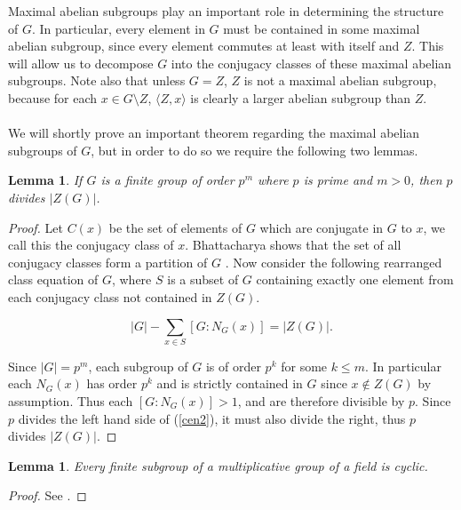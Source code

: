 \documentclass[a4paper , 11pt]{book}
\newtheorem{lemma}[theorem]{Lemma}
\theoremstyle{definition}
\theoremstyle{remark}
\begin{document}
Maximal abelian subgroups play an important role in determining the structure of $G$. In particular, every element in $G$ must be contained in some maximal abelian subgroup, since every element commutes at least with itself and $Z$. This will allow us to decompose $G$ into the conjugacy classes of these maximal abelian subgroups. Note also that unless $G=Z$, $Z$ is not a maximal abelian subgroup, because for each $x \in G \! \setminus \! Z$, $\langle Z,x \rangle$ is clearly a larger abelian subgroup than $Z$. \\
\\
We will shortly prove an important theorem regarding the maximal abelian subgroups of $G$, but in order to do so we require the following two lemmas. \\

\begin{lemma}\label{primecentre}
If $G$ is a finite group of order $p^m$ where $p$ is prime and $m>0$, then $p$ divides $|Z(G)|$. 
\end{lemma}

\begin{proof}
Let $C(x)$ be the set of elements of $G$ which are conjugate in $G$ to $x$, we call this the conjugacy class of $x$. Bhattacharya shows that the set of all conjugacy classes form a partition of $G$ \cite[p.112]{bhattacharya}. Now consider the following rearranged class equation of $G$, where $S$ is a subset of $G$ containing exactly one element from each conjugacy class not contained in $Z(G)$. 
 
\begin{equation} \label{cen2}
|G| - \sum_{x \in S} [G:N_G(x)] = |Z(G)|.
\end{equation}

Since $|G| = p^m$, each subgroup of $G$ is of order $p^k$ for some $k \leq m$. In particular each $N_G(x)$ has order $p^k$ and is strictly contained in $G$ since $x \not \in Z(G)$ by assumption. Thus each $[G:N_G(x)] > 1$, and are therefore divisible by $p$. Since $p$ divides the left hand side of (\ref{cen2}), it must also divide the right, thus $p$ divides $|Z(G)|$. 

\end{proof}

\begin{lemma}\label{finsubcyc}
Every finite subgroup of a multiplicative group of a field is cyclic.
\end{lemma}

\begin{proof} See \cite[p.41]{suzuki}.
\end{proof}
\end{document}
